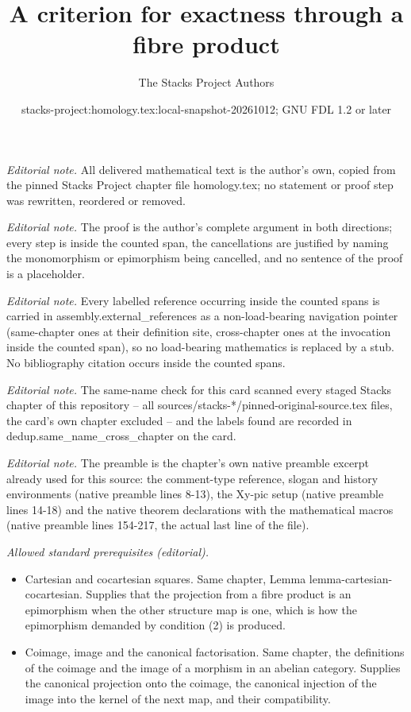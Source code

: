 \documentclass[10pt,a4paper]{amsart}
\title{A criterion for exactness through a fibre product}
\author{The Stacks Project Authors}
\date{stacks-project:homology.tex:local-snapshot-20261012; GNU FDL 1.2 or later}
\theoremstyle{plain}
\theoremstyle{definition}
\theoremstyle{remark}
\numberwithin{equation}{subsection}
\begin{document}
\maketitle
\noindent\textit{Editorial note.} All delivered mathematical text is the author's own, copied from the pinned Stacks Project chapter file homology.tex; no statement or proof step was rewritten, reordered or removed.\par\medskip
\noindent\textit{Editorial note.} The proof is the author's complete argument in both directions; every step is inside the counted span, the cancellations are justified by naming the monomorphism or epimorphism being cancelled, and no sentence of the proof is a placeholder.\par\medskip
\noindent\textit{Editorial note.} Every labelled reference occurring inside the counted spans is carried in assembly.external\_references as a non-load-bearing navigation pointer (same-chapter ones at their definition site, cross-chapter ones at the invocation inside the counted span), so no load-bearing mathematics is replaced by a stub. No bibliography citation occurs inside the counted spans.\par\medskip
\noindent\textit{Editorial note.} The same-name check for this card scanned every staged Stacks chapter of this repository -- all sources/stacks-*/pinned-original-source.tex files, the card's own chapter excluded -- and the labels found are recorded in dedup.same\_name\_cross\_chapter on the card.\par\medskip
\noindent\textit{Editorial note.} The preamble is the chapter's own native preamble excerpt already used for this source: the comment-type reference, slogan and history environments (native preamble lines 8-13), the Xy-pic setup (native preamble lines 14-18) and the native theorem declarations with the mathematical macros (native preamble lines 154-217, the actual last line of the file).\par\medskip
\noindent\textit{Allowed standard prerequisites (editorial).}\begin{itemize}
\item Cartesian and cocartesian squares. Same chapter, Lemma lemma-cartesian-cocartesian. Supplies that the projection from a fibre product is an epimorphism when the other structure map is one, which is how the epimorphism demanded by condition (2) is produced.
\item Coimage, image and the canonical factorisation. Same chapter, the definitions of the coimage and the image of a morphism in an abelian category. Supplies the canonical projection onto the coimage, the canonical injection of the image into the kernel of the next map, and their compatibility.
\end{itemize}\medskip
\end{document}
